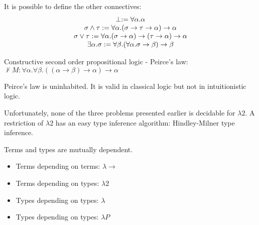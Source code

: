It is possible to define the other connectives:
\[
\begin{array}{c}
\perp := \forall \alpha. \alpha \\
\sigma \wedge \tau := \forall \alpha. (\sigma \to \tau \to \alpha) \to \alpha \\
\sigma \vee \tau := \forall \alpha. (\sigma \to \alpha) \to (\tau \to \alpha) \to \alpha \\
\exists \alpha. \sigma := \forall \beta. (\forall \alpha. \sigma \to \beta) \to \beta
\end{array}
\]

Constructive second order propositional logic - Peirce's law: 
$\not\vdash M : \forall \alpha. \forall \beta. ((\alpha \to \beta) \to \alpha) \to \alpha$

Peirce's law is uninhabited. It is valid in classical logic but not in intuitionistic logic.

Unfortunately, none of the three problems presented earlier is decidable for $\lambda 2$. A restriction of $\lambda 2$ has
an easy type inference algorithm: Hindley-Milner type inference.

Terms and types are mutually dependent.
\begin{itemize}
\item Terms depending on terms: $\lambda \to$
\item Terms depending on types: $\lambda 2$
\item Types depending on types: $\lambda$ \underbar{$\omega$}
\item Types depending on types: $\lambda P$
\end{itemize}



